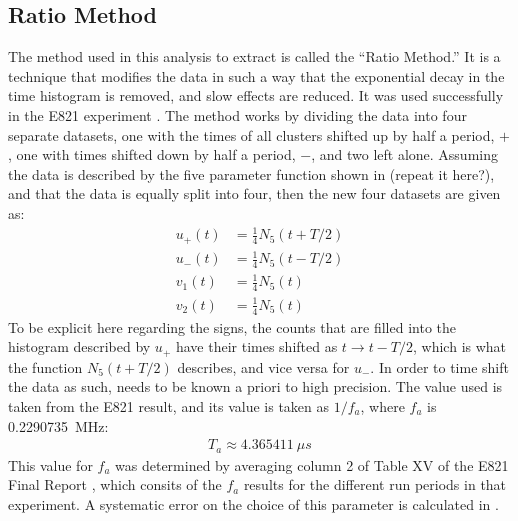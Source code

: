 







\subsection{Ratio Method}


The method used in this analysis to extract \wa is called the ``Ratio Method.'' It is a technique that modifies the data in such a way that the exponential decay in the time histogram is removed, and slow effects are reduced. It was used successfully in the E821 experiment \cite{JKThesis,LDThesis,JPThesis}. The method works by dividing the data into four separate datasets, one with the times of all clusters shifted up by half a \gmtwo period, $+$\Tatwo, one with times shifted down by half a \gmtwo period, $-$\Tatwo, and two left alone. Assuming the data is described by the five parameter function  shown in  (repeat it here?), and that the data is equally split into four, then the new four datasets are given as:
    \begin{equation}
    \begin{aligned}
        u_{+}(t) &= \frac{1}{4} N_{5}(t+T/2) \\
        u_{-}(t) &= \frac{1}{4} N_{5}(t-T/2) \\
        v_{1}(t) &= \frac{1}{4} N_{5}(t) \\
        v_{2}(t) &= \frac{1}{4} N_{5}(t)
    \end{aligned}
    \end{equation}
To be explicit here regarding the signs, the counts that are filled into the histogram described by $u_{+}$ have their times shifted as $t \rightarrow t - T/2$, which is what the function $N_{5}(t+T/2)$ describes, and vice versa for $u_{-}$. In order to time shift the data as such, \Ta needs to be known a priori to high precision. The value used is taken from the E821 result, and its value is taken as $1/f_{a}$, where $f_{a}$ is \SI{0.2290735}{MHz}:
        \begin{align}
            T_{a} \approx \SI{4.365411}{\mu s}
        \label{eq:Ta}
        \end{align}
This value for $f_{a}$ was determined by averaging column 2 of Table XV of the E821 Final Report \cite{E821FinalReport}, which consits of the $f_{a}$ results for the different run periods in that experiment. A systematic error on the choice of this parameter is calculated in .


